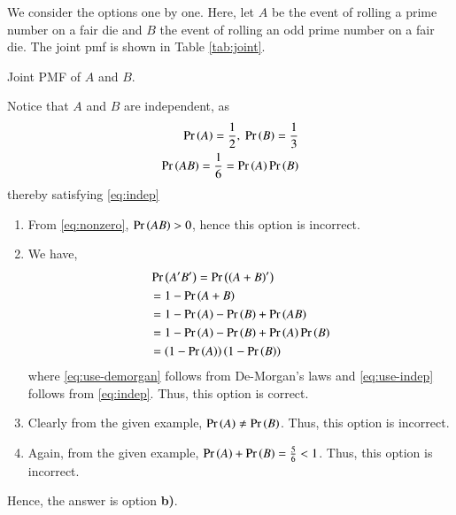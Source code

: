 \documentclass[journal,12pt,twocolumn]{IEEEtran}
\begin{document}
\begin{enumerate}
    We consider the options one by one. Here, let $A$ be the event
    of rolling a prime number on a fair die and $B$ the event of
    rolling an odd prime number on a fair die. The joint pmf is shown
    in Table \ref{tab:joint}.
    \begin{table}[!ht]
        \centering
        
        \caption{Joint PMF of $A$ and $B$.}
        \label{tab:joint}
    \end{table}
    Notice that $A$ and $B$ are independent, as
    \begin{align}
        \Pr\left(A\right) = \frac{1}{2},\ \Pr\left(B\right) = \frac{1}{3} \\
        \Pr\left(AB\right) = \frac{1}{6} = \Pr\left(A\right)\Pr\left(B\right) \label{eq:nonzero}
    \end{align}
    thereby satisfying \eqref{eq:indep}
    \begin{enumerate}
        \item From \eqref{eq:nonzero}, $\Pr\left(AB\right) > 0$, hence this option is
        incorrect.
        \item We have,
        \begin{align}
            &\Pr\left(A'B'\right) = \Pr\left(\left(A+B\right)'\right) \label{eq:use-demorgan} \\
            &= 1 - \Pr\left(A+B\right) \\
            &= 1 - \Pr\left(A\right) - \Pr\left(B\right) + \Pr\left(AB\right) \\
            &= 1 - \Pr\left(A\right) - \Pr\left(B\right) + \Pr\left(A\right)\Pr\left(B\right) \label{eq:use-indep} \\
            &= \left(1-\Pr\left(A\right)\right)\left(1-\Pr\left(B\right)\right)
        \end{align}
        where \eqref{eq:use-demorgan} follows from De-Morgan's laws and
        \eqref{eq:use-indep} follows from \eqref{eq:indep}. Thus, this option is
        correct.
        \item Clearly from the given example, $\Pr\left(A\right) \neq \Pr\left(B\right)$. Thus, this
        option is incorrect.
        \item Again, from the given example, $\Pr\left(A\right) + \Pr\left(B\right) = \frac{5}{6} < 1$.
        Thus, this option is incorrect.
    \end{enumerate}
    Hence, the answer is option \textbf{b)}.
\end{enumerate}
\end{document}
